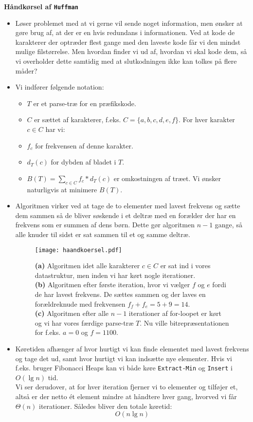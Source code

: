 \textbf{Håndkørsel af \texttt{Huffman}}
\begin{itemize}
	\item Løser problemet med at vi gerne vil sende noget information, men ønsker at gøre brug af, at der er en hvis redundans i informationen. Ved at kode de karakterer der optræder flest gange med den laveste kode får vi den mindst mulige filstørrelse. Men hvordan finder vi ud af, hvordan vi skal kode dem, så vi overholder dette samtidig med at slutkodningen ikke kan tolkes på flere måder?
	\item Vi indfører følgende notation:
	\begin{itemize}
		\item $T$ er et parse-træ for en præfikskode.
		\item $C$ er sættet af karakterer, f.eks. $C = \{a, b, c, d, e, f\}$. For hver karakter $c \in C$ har vi:
		\item $f_c$ for frekvensen af denne karakter.
		\item $d_T(c)$ for dybden af bladet i $T$.
		\item $B(T) = \displaystyle\sum_{c \in C} f_c * d_T(c)$ er omkostningen af træet. Vi ønsker naturligvis at minimere $B(T)$.
	\end{itemize}
	\item Algoritmen virker ved at tage de to elementer med lavest frekvens og sætte dem sammen så de bliver søskende i et deltræ med en forælder der har en frekvens som er summen af dens børn. Dette gør algoritmen $n-1$ gange, så alle knuder til sidst er sat sammen til et og samme deltræ.
	\begin{figure}[H]
		\begin{center}
			\texttt{[image: haandkoersel.pdf]}
		\end{center}
		\caption{
		\textbf{(a)} Algoritmen idet alle karakterer $c \in C$ er sat ind i vores datastruktur, men inden vi har kørt nogle iterationer.\\
		\textbf{(b)} Algoritmen efter første iteration, hvor vi vælger $f$ og $e$ fordi de har lavest frekvens. De sættes sammen og der laves en forældreknude med frekvensen $f_f + f_e = 5+9=14$.\\
		\textbf{(c)} Algoritmen efter alle $n-1$ iterationer af for-loopet er kørt og vi har vores færdige parse-træ $T$. Nu ville bitrepræsentationen for f.eks. $a=0$ og $f = 1100$.}
		\label{fig:haandkoersel}
	\end{figure}
	\item Køretiden afhænger af hvor hurtigt vi kan finde elementet med lavest frekvens og tage det ud, samt hvor hurtigt vi kan indsætte nye elementer. Hvis vi f.eks. bruger Fibonacci Heaps kan vi både køre \texttt{Extract-Min} og \texttt{Insert} i $O(\lg n)$ tid.\\
	Vi ser derudover, at for hver iteration fjerner vi to elementer og tilføjer et, altså er der netto ét element mindre at håndtere hver gang, hvorved vi får $\Theta(n)$ iterationer. Således bliver den totale køretid:
	$$
	O(n \lg n)
	$$
\end{itemize}





